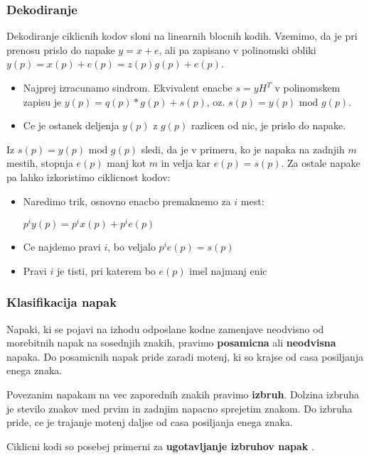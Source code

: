 \documentclass{article}
\begin{document}
\begin{multicols}{4}
\subsubsection{Dekodiranje}
Dekodiranje ciklicnih kodov sloni na linearnih blocnih kodih. Vzemimo, da je pri prenosu prislo do napake $y = x + e$, ali pa zapisano v polinomski
obliki $y(p) = x(p) + e(p) = z(p)g(p) + e(p)$.
\begin{itemize}
    \item Najprej izracunamo sindrom. Ekvivalent enacbe $s = yH^T$ v polinomskem zapisu je $y(p) = q(p)*g(p) + s(p)$, oz. $s(p) = y(p) \text{ mod } g(p)$.
    \item Ce je ostanek deljenja $y(p)$ z $g(p)$ razlicen od nic, je prislo do napake.
\end{itemize}
Iz $s(p) = y(p) \text{ mod } g(p)$ sledi, da je v primeru, ko je napaka na zadnjih $m$ mestih, stopnja $e(p)$ manj kot $m$ in velja kar $e(p) = s(p)$.
Za ostale napake pa lahko izkoristimo ciklicnost kodov:
\begin{itemize}
    \item Naredimo trik, osnovno enacbo premaknemo za $i$ mest:
        \begin{center}
            $p^iy(p) = p^ix(p) + p^i e(p)$
        \end{center}
    \item Ce najdemo pravi $i$, bo veljalo $p^i e(p) = s(p)$
    \item Pravi $i$ je tisti, pri katerem bo $e(p)$ imel najmanj enic
\end{itemize}

\subsubsection{Klasifikacija napak}
Napaki, ki se pojavi na izhodu odposlane kodne zamenjave neodvisno od morebitnih napak
na sosednjih znakih, pravimo \textbf{posamicna} ali \textbf{neodvisna} napaka. Do posamicnih 
napak pride zaradi motenj, ki so krajse od casa posiljanja enega znaka.

Povezanim napakam na vec zaporednih znakih pravimo \textbf{izbruh}. Dolzina izbruha je stevilo znakov med
prvim in zadnjim napacno sprejetim znakom. Do izbruha pride, ce je trajanje motenj daljse od casa posiljanja enega znaka.

Ciklicni kodi so posebej primerni za \textbf{ ugotavljanje izbruhov napak }.


\end{multicols}
\end{document}
